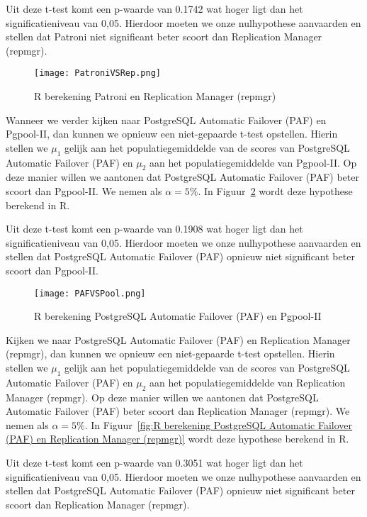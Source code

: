 Uit deze t-test komt een p-waarde van 0.1742 wat hoger ligt dan het significatieniveau van 0,05. Hierdoor moeten we onze nulhypothese aanvaarden en stellen dat Patroni niet significant beter scoort dan Replication Manager (repmgr).

\begin{figure}[!h]
    \centering
    \texttt{[image: PatroniVSRep.png]}
    \caption{R berekening Patroni en Replication Manager (repmgr)}
    \label{fig:R berekening Patroni en Replication Manager (repmgr)}
\end{figure}

Wanneer we verder kijken naar PostgreSQL Automatic Failover (PAF) en Pgpool-II, dan kunnen we opnieuw een niet-gepaarde t-test opstellen. Hierin stellen we $\mu_1$ gelijk aan het populatiegemiddelde van de scores van PostgreSQL Automatic Failover (PAF) en $\mu_2$ aan het populatiegemiddelde van Pgpool-II. Op deze manier willen we aantonen dat PostgreSQL Automatic Failover (PAF) beter scoort dan Pgpool-II. We nemen als $\alpha = 5\%$. In Figuur~\ref{fig:R berekening PostgreSQL Automatic Failover (PAF) en Pgpool-II} wordt deze hypothese berekend in R.

Uit deze t-test komt een p-waarde van 0.1908 wat hoger ligt dan het significatieniveau van 0,05. Hierdoor moeten we onze nulhypothese aanvaarden en stellen dat PostgreSQL Automatic Failover (PAF) opnieuw niet significant beter scoort dan Pgpool-II.

\begin{figure}[!h]
    \centering
    \texttt{[image: PAFVSPool.png]}
    \caption{R berekening PostgreSQL Automatic Failover (PAF) en Pgpool-II}
    \label{fig:R berekening PostgreSQL Automatic Failover (PAF) en Pgpool-II}
\end{figure}

Kijken we naar PostgreSQL Automatic Failover (PAF) en Replication Manager (repmgr), dan kunnen we opnieuw een niet-gepaarde t-test opstellen. Hierin stellen we $\mu_1$ gelijk aan het populatiegemiddelde van de scores van PostgreSQL Automatic Failover (PAF) en $\mu_2$ aan het populatiegemiddelde van Replication Manager (repmgr). Op deze manier willen we aantonen dat PostgreSQL Automatic Failover (PAF) beter scoort dan Replication Manager (repmgr). We nemen als $\alpha = 5\%$. In Figuur~\ref{fig:R berekening PostgreSQL Automatic Failover (PAF) en Replication Manager (repmgr)} wordt deze hypothese berekend in R.

Uit deze t-test komt een p-waarde van 0.3051 wat hoger ligt dan het significatieniveau van 0,05. Hierdoor moeten we onze nulhypothese aanvaarden en stellen dat PostgreSQL Automatic Failover (PAF) opnieuw niet significant beter scoort dan Replication Manager (repmgr).

